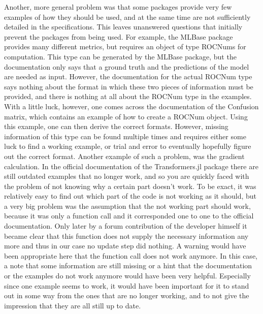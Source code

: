 Another, more general problem was that some packages provide very few examples of how they should be used, and at the same time are not sufficiently detailed in the specifications. This leaves unanswered questions that initially prevent the packages from being used. For example, the MLBase package provides many different metrics, but requires an object of type ROCNums for computation. This type can be generated by the MLBase package, but the documentation only says that a ground truth and the predictions of the model are needed as input. However, the documentation for the actual ROCNum type says nothing about the format in which these two pieces of information must be provided, and there is nothing at all about the ROCNum type in the examples. With a little luck, however, one comes across the documentation of the Confusion matrix, which contains an example of how to create a ROCNum object. Using this example, one can then derive the correct formats. However, missing information of this type can be found multiple times and requires either some luck to find a working example, or trial and error to eventually hopefully figure out the correct format.  Another example of such a problem, was the gradient calculation. In the official documentation of the Transformers.jl package there are still outdated examples that no longer work, and so you are quickly faced with the problem of not knowing why a certain part doesn't work. To be exact, it was relatively easy to find out which part of the code is not working as it should, but a very big problem was the assumption that the not working part should work, because it was only a function call and it corresponded one to one to the official documentation. Only later by a forum contribution of the developer himself it became clear that this function does not supply the necessary information any more and thus in our case no update step did nothing. A warning would have been appropriate here that the function call does not work anymore. In this case, a note that some information are still missing or a hint that the documentation or the examples do not work anymore would have been very helpful. Especially since one example seems to work, it would have been important for it to stand out in some way from the ones that are no longer working, and to not give the impression that they are all still up to date.
\color{black}

